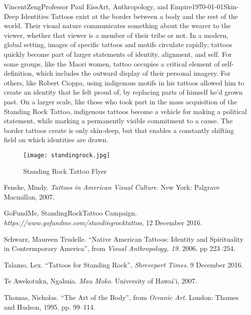 \documentclass[12pt]{article}
\begin{document}
\begin{mla}{Vincent}{Zeng}{Professor Paul Eiss}{Art, Anthropology, and
  Empire}{\today}{Skin-Deep Identities}
Tattoos exist at the border between a body and the rest of the world. Their
visual nature communicates something about the wearer to the viewer, whether
that viewer is a member of their tribe or not. In a modern, global setting,
images of specific tattoos and motifs circulate rapidly; tattoos quickly become
part of larger statements of identity, alignment, and self. For some groups,
like the Maori women, tattoo occupies a critical element of self-definition,
which includes the outward display of their personal imagery. For others, like
Robert Cioppa, using indigenous motifs in his tattoos allowed him to create an
identity that he felt proud of, by replacing parts of himself he'd grown past.
On a larger scale, like those who took part in the mass acquisition of the
Standing Rock Tattoo, indigenous tattoos
become a vehicle for making a political statement, while marking a permanently
visible commitment to a cause. The border tattoos create is only skin-deep, but
that enables a constantly shifting field on which identities are drawn.
  \newpage

  \begin{figure}[ht!]
      \centering
      \texttt{[image: standingrock.jpg]}
      \caption{Standing Rock Tattoo Flyer\label{overflow}}
  \end{figure}

\begin{workscited}
  \bibent
  Fenske, Mindy. \textit{Tattoos in American Visual Culture}. New York: Palgrave
  Macmillan, 2007.

  \bibent
  GoFundMe, StandingRockTattoo Campaign.
  \textit{https://www.gofundme.com/standingrocktattoo}, 12 December 2016.

  \bibent
  Schwarz, Maureen Trudelle. ``Native American Tattoos: Identity and
  Spirituality in Contermporary America'', from \textit{Visual Anthropology,
  19}. 2006. pp 223--254.

  \bibent
  Talamo, Lex. ``Tattoos for Standing Rock'', \textit{Shreveport Times}. 9
  December 2016.

  \bibent
  Te Awekotuku, Ngahuia. \textit{Mau Moko}. University of Hawai'i, 2007.

  \bibent
  Thomas, Nicholas. ``The Art of the Body'', from \textit{Oceanic Art}. London:
  Thames and Hudson, 1995. pp.  99--114.

\end{workscited}
\end{mla}
\end{document}
